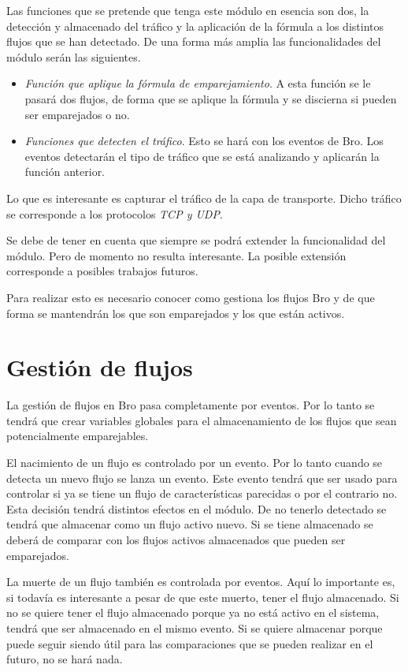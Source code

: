 \intro Las funciones que se pretende que tenga este módulo en esencia son dos, la detección y almacenado 
del tráfico y la aplicación de la fórmula a los distintos flujos que se han detectado. De una forma más amplia 
las funcionalidades del módulo serán las siguientes. 

\begin{itemize}
\item \textit{Función que aplique la fórmula de emparejamiento}. 
\intro A esta función se le pasará dos flujos, de forma que se aplique la fórmula y se discierna si pueden 
ser emparejados o no.
\item \textit{Funciones que detecten el tráfico}. 
\intro Esto se hará con los eventos de Bro. Los eventos detectarán el tipo de tráfico que se está analizando 
y aplicarán la función anterior.
\end{itemize}

\intro Lo que es interesante es capturar el tráfico de la capa de transporte. Dicho tráfico se corresponde a los protocolos \textit{TCP y UDP}. 

\intro Se debe de tener en cuenta que siempre se podrá extender la funcionalidad del módulo. Pero de momento no resulta interesante. La posible extensión corresponde a posibles trabajos futuros.

\intro Para realizar esto es necesario conocer como gestiona los flujos Bro y de que forma se mantendrán los que 
son emparejados y los que están activos.

\section{Gestión de flujos}

La gestión de flujos en Bro pasa completamente por eventos. Por lo tanto se tendrá que crear variables globales 
para el almacenamiento de los flujos que sean potencialmente emparejables. 

\intro El nacimiento de un flujo es controlado por un evento. Por lo tanto cuando se detecta un nuevo flujo se 
lanza un evento. Este evento tendrá que ser usado para controlar si ya se tiene un flujo de características 
parecidas o por el contrario no. Esta decisión tendrá distintos efectos en el módulo. De no tenerlo detectado 
se tendrá que almacenar como un flujo activo nuevo. Si se tiene almacenado se deberá de comparar con los flujos 
activos almacenados que pueden ser emparejados.

\intro La muerte de un flujo también es controlada por eventos. Aquí lo importante es, si todavía es interesante 
a pesar de que este muerto, tener el flujo almacenado. Si no se quiere tener el flujo almacenado porque ya no 
está activo en el sistema, tendrá que ser almacenado en el mismo evento. Si se quiere almacenar porque puede 
seguir siendo útil para las comparaciones que se pueden realizar en el futuro, no se hará nada. 

